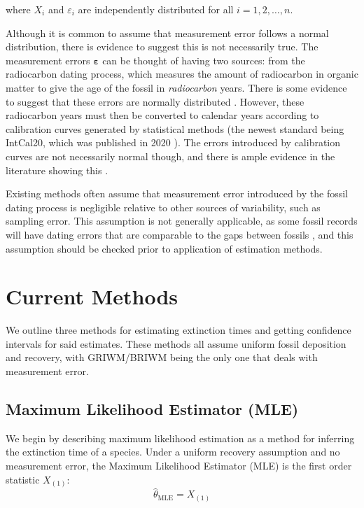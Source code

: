 where $X_i$ and $\varepsilon_i$ are independently distributed for all $i = 1, 2, \dots, n$.

Although it is common to assume that measurement error follows a normal distribution, there is evidence to suggest this is not necessarily true. The measurement errors $\bm{\varepsilon}$ can be thought of having two sources: from the radiocarbon dating process, which measures the amount of radiocarbon in organic matter to give the age of the fossil in \textit{radiocarbon} years. There is some evidence to suggest that these errors are normally distributed \parencite{Walker2005Quaternary, Taylor1987}. However, these radiocarbon years must then be converted to calendar years according to calibration curves generated by statistical methods (the newest standard being IntCal20, which was published in 2020 \parencite{Reimer2020}). The errors introduced by calibration curves are not necessarily normal though, and there is ample evidence in the literature showing this \parencite{Ramsey2009, Ramsey2010, Ramsey2013}.

Existing methods often assume that measurement error introduced by the fossil dating process is negligible relative to other sources of variability, such as sampling error. This assumption is not generally applicable, as some fossil records will have dating errors that are comparable to the gaps between fossils \parencite{Solow2006}, and this assumption should be checked prior to application of estimation methods. %

\section{Current Methods}

We outline three methods for estimating extinction times and getting confidence intervals for said estimates. These methods all assume uniform fossil deposition and recovery, with GRIWM/BRIWM being the only one that deals with measurement error.

\subsection{Maximum Likelihood Estimator (MLE)}

We begin by describing maximum likelihood estimation as a method for inferring the extinction time of a species. Under a uniform recovery assumption and no measurement error, the Maximum Likelihood Estimator (MLE) is the first order statistic $X_{(1)}$:
\begin{equation}\label{eq:mle}
    \hat\theta_{\text{MLE}} = X_{(1)}
\end{equation}

